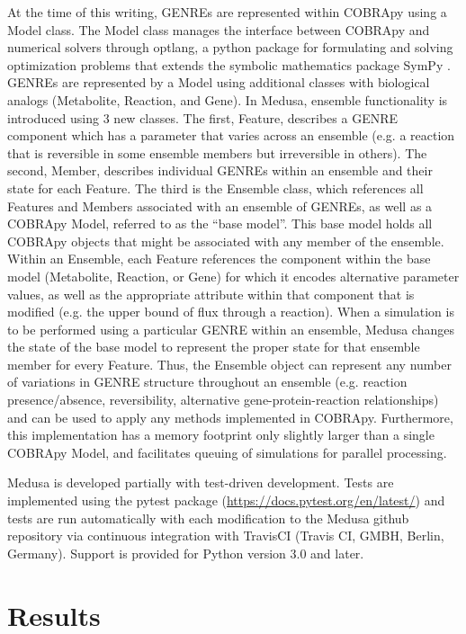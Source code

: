 \documentclass[11pt,twocolumn,notitlepage,openany,twoside]{book}
\begin{document}
\begin{refsection}
At the time of this writing, GENREs are represented within COBRApy using a Model class. The Model class manages the interface between COBRApy and numerical solvers through optlang, a python package for formulating and solving optimization problems that extends the symbolic mathematics package SymPy \cite{Jensen2016-nu,Meurer2017-mu}. GENREs are represented by a Model using additional classes with biological analogs (Metabolite, Reaction, and Gene). In Medusa, ensemble functionality is introduced using 3 new classes. The first, Feature, describes a GENRE component which has a parameter that varies across an ensemble (e.g. a reaction that is reversible in some ensemble members but irreversible in others). The second, Member, describes individual GENREs within an ensemble and their state for each Feature. The third is the Ensemble class, which references all Features and Members associated with an ensemble of GENREs, as well as a COBRApy Model, referred to as the “base model”. This base model holds all COBRApy objects that might be associated with any member of the ensemble. Within an Ensemble, each Feature references the component within the base model (Metabolite, Reaction, or Gene) for which it encodes alternative parameter values, as well as the appropriate attribute within that component that is modified (e.g. the upper bound of flux through a reaction). When a simulation is to be performed using a particular GENRE within an ensemble, Medusa changes the state of the base model to represent the proper state for that ensemble member for every Feature. Thus, the Ensemble object can represent any number of variations in GENRE structure throughout an ensemble (e.g. reaction presence/absence, reversibility, alternative gene-protein-reaction relationships) and can be used to apply any methods implemented in COBRApy. Furthermore, this implementation has a memory footprint only slightly larger than a single COBRApy Model, and facilitates queuing of simulations for parallel processing.

Medusa is developed partially with test-driven development. Tests are implemented using the pytest package (\url{https://docs.pytest.org/en/latest/}) and tests are run automatically with each modification to the Medusa github repository via continuous integration with TravisCI (Travis CI, GMBH, Berlin, Germany). Support is provided for Python version 3.0 and later.

\section{Results}

\end{refsection}
\end{document}
